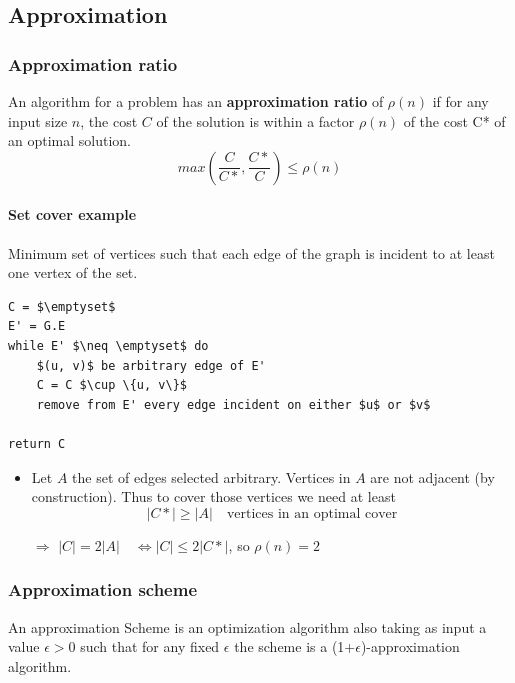\subsection{Approximation}

\subsubsection{Approximation ratio}
An algorithm for a problem has an \textbf{approximation ratio} of $\rho(n)$ if
for any input size $n$, the cost $C$ of the solution is within a factor
$\rho(n)$ of the cost C* of an optimal solution.
$$max(\frac{C}{C*}, \frac{C*}{C}) \leq \rho(n)$$

\paragraph{Set cover example}
Minimum set of vertices such that each
edge of the graph is incident to at least one vertex of
the set.

\begin{lstlisting}[mathescape, caption=Greddy set cover]
C = $\emptyset$
E' = G.E
while E' $\neq \emptyset$ do
    $(u, v)$ be arbitrary edge of E'
    C = C $\cup \{u, v\}$
    remove from E' every edge incident on either $u$ or $v$

return C
\end{lstlisting}

\begin{itemize}
        \item Let $A$ the set of edges selected arbitrary. Vertices in
            $A$ are not adjacent (by construction). Thus to cover those
            vertices we need at least 
            $$|C*| \geq |A| \quad \textrm{vertices in an optimal
            cover}$$

        \item[$\Rightarrow$] $|C| = 2 |A| \quad \Leftrightarrow |C| \leq
            2 |C*|$, so            $\rho(n) = 2$
\end{itemize}


\subsubsection{Approximation scheme}
An approximation Scheme is an optimization algorithm also taking as input a value 
$\epsilon > 0$ such that for any fixed $\epsilon$ the scheme is a
(1+$\epsilon$)-approximation algorithm.

